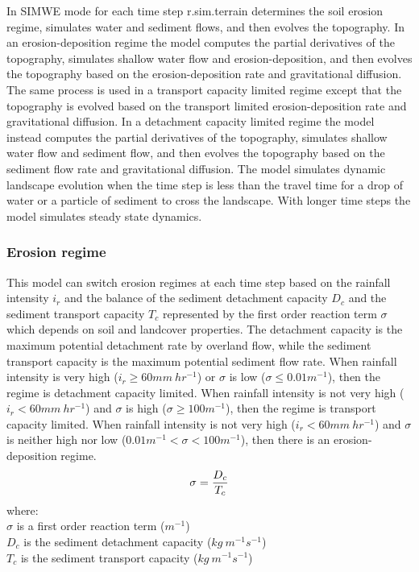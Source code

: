 \documentclass[esurf, manuscript]{copernicus}
\begin{document}
In SIMWE mode 
for each time step
\lowercase{r.sim.terrain}
determines the soil erosion regime,
simulates water and sediment flows, 
and then evolves the topography. 
In an erosion-deposition regime 
the model 
computes the partial derivatives of the topography,
simulates shallow water flow and erosion-deposition,
and then evolves the topography based on the erosion-deposition rate
and gravitational diffusion.
The same process is used in
a transport capacity limited regime
except that the topography is evolved based on 
the transport limited erosion-deposition rate
and gravitational diffusion.
In a detachment capacity limited regime
the model instead
computes the partial derivatives of the topography,
simulates shallow water flow and sediment flow,
and then evolves the topography based on the sediment flow rate
and gravitational diffusion.
The model simulates dynamic landscape evolution 
when the time step is less than the travel time 
for a drop of water or a particle of sediment to cross the landscape.
With longer time steps the model simulates steady state dynamics. 


\subsubsection{Erosion regime}

This model can switch erosion regimes at each time step
based on the rainfall intensity $i_r$
and the balance of the sediment detachment capacity $D_c$
and the sediment transport capacity $T_c$
represented by the first order reaction term $\sigma$ 
which depends on soil and landcover properties.
The detachment capacity is the maximum potential 
detachment rate by overland flow, while
the sediment transport capacity 
is the maximum potential sediment flow rate.
When rainfall intensity is very high ($i_r \geq 60 mm~hr^{-1}$)
or $\sigma$ is low ($\sigma \leq 0.01 m^{-1}$),
then the regime is detachment capacity limited. 
%
When rainfall intensity is not very high ($i_r < 60 mm~hr^{-1} $)
and $\sigma$ is high ($\sigma \geq 100 m^{-1}$),
then the regime is transport capacity limited. 
%
When rainfall intensity is not very high 
($i_r<60 mm~hr^{-1}$)
and $\sigma$ is neither high nor low 
($ 0.01 m^{-1}< \sigma < 100 m^{-1}$),
then there is an erosion-deposition regime. \\
\begin{equation}
\label{eq:regime}
\sigma = {D_c \over T_c}
\end{equation}
{\small
\noindent
where: \\
\noindent
\hspace*{0.5em} $\sigma$  is a first order reaction term ($m^{-1}$)\\
\hspace*{0.5em} $D_c$ is the sediment detachment capacity ($kg~m^{-1}s^{-1}$)\\
\hspace*{0.5em} $T_c$ is the sediment transport capacity ($kg~m^{-1}s^{-1}$)\\
}
\end{document}
